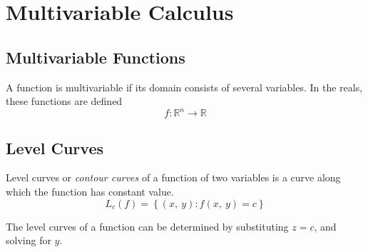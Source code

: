 \documentclass{article}
\begin{document}
\section{Multivariable Calculus}
\subsection{Multivariable Functions}
\begin{definition}
    A function is multivariable if its domain consists of several variables. In the reals, these functions are defined
    \begin{equation*}
        f:\mathbb{R}^n\to\mathbb{R}
    \end{equation*}
\end{definition}
\subsection{Level Curves}
\begin{definition}
    Level curves or \textit{contour curves} of a function of two variables is a curve along which the function has constant value.
    \begin{equation*}
        L_c\left( f \right) = \left\{ \left( x,\: y \right) : f\left(x,\: y\right) = c\right\}
    \end{equation*}
\end{definition}
The level curves of a function can be determined by substituting $z=c$, and solving for $y$.
\end{document}
